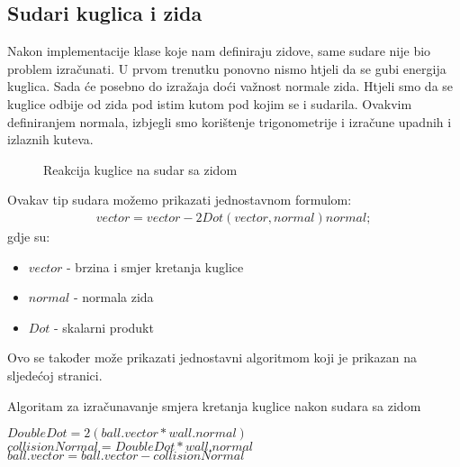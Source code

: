 \subsection{Sudari kuglica i zida}
Nakon implementacije klase koje nam definiraju zidove, same sudare nije bio problem izračunati. U prvom trenutku ponovno nismo htjeli da se gubi energija kuglica. Sada će posebno do izražaja doći važnost normale zida. Htjeli smo da se kuglice odbije od zida pod istim kutom pod kojim se i sudarila. Ovakvim definiranjem normala, izbjegli smo korištenje trigonometrije i izračune upadnih i izlaznih kuteva.
\begin{figure}[!http]
	\begin{center}
	\end{center}
	\caption {Reakcija kuglice na sudar sa zidom}
	\label{fig:21}
\end{figure}
Ovakav tip sudara možemo prikazati jednostavnom formulom:
\begin{equation}\label{equ:wall_collision}
		\begin{aligned}
			vector = vector - 2Dot(vector, normal) normal;
		\end{aligned}
\end{equation}
gdje su:
\begin{itemize}
	\item $vector$ - brzina i smjer kretanja kuglice
	\item $normal$ - normala zida
	\item $Dot$ - skalarni produkt
\end{itemize}
Ovo se također može prikazati jednostavni algoritmom koji je prikazan na sljedećoj stranici.\newpage
\begin{algorithm}
	\caption{Algoritam za izračunavanje smjera kretanja kuglice nakon sudara sa zidom}
	\label{alg:resolve_Wallcollision}
	\begin{algorithmic}
		\Return
		\EndIf
		\State $DoubleDot = 2  (ball.vector * wall.normal)$
		\State $collisionNormal = DoubleDot * wall.normal$
		\State $ball.vector = ball.vector - collisionNormal$
		\EndFunction
	\end{algorithmic}
\end{algorithm}

